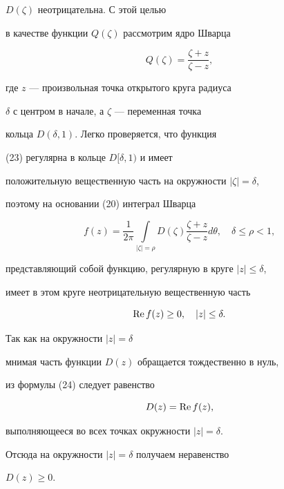 \begin{pf}
$D(\zeta)$ неотрицательна. С этой целью


в качестве функции $Q(\zeta)$ рассмотрим ядро Шварца


\begin{equation}


Q(\zeta)=\frac{\zeta+z}{\zeta-z},


\end{equation}


где $z$ --- произвольная точка открытого круга радиуса


$\delta$ с центром в начале, а $\zeta$ --- переменная точка


кольца $D(\delta,1)$. Легко проверяется, что функция


(23) регулярна в кольце $D[\delta,1)$ и имеет 


положительную вещественную часть на окружности $|\zeta|=\delta$,


поэтому на основании (20) интеграл Шварца


\begin{equation}


f(z)=\frac{1}{2\pi}


\int\limits_{|\zeta|=\rho}D(\zeta)\frac{\zeta+z}{\zeta-z}d\theta,


\quad \delta\le\rho<1,


\end{equation}


представляющий собой функцию, регулярную в круге $|z|\le\delta$, 


имеет в этом круге неотрицательную вещественную часть


$$


\re f(z)\ge 0,\quad |z|\le\delta.


$$


Так как на окружности $|z|=\delta$


мнимая часть функции $D(z)$ обращается тождественно в нуль,


из формулы (24) следует равенство


$$


D(z)=\re f(z),


$$


выполняющееся во всех точках окружности $|z|=\delta$.


Отсюда на окружности $|z|=\delta$ получаем неравенство


$D(z)\ge 0$.


\end{pf}





